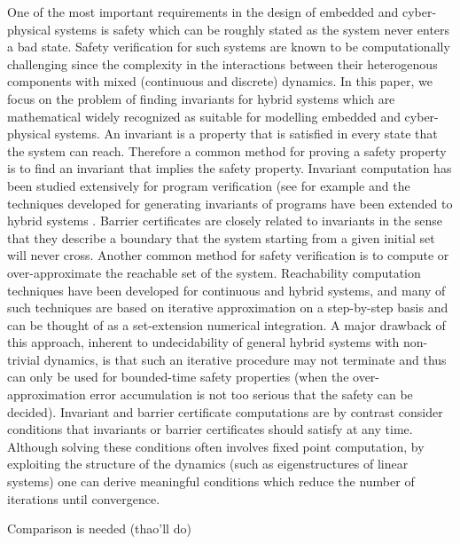 One of the most important requirements in the design of embedded and cyber-physical systems is safety which can be roughly stated as the system never enters a bad state. Safety verification for such systems are known to be computationally challenging since the complexity in the interactions between their heterogenous components with mixed (continuous and discrete) dynamics. In this paper, we focus on the problem of finding invariants for hybrid systems which are mathematical widely recognized as suitable for modelling embedded and cyber-physical systems. An invariant is a property that is satisfied in every state that the system can reach. 
Therefore a common method for proving a safety property is to find an invariant that implies the safety property. Invariant computation has been studied extensively for program verification (see for example \cite{CousotHalbwachs1978,Bensalem2000,Tiwari2001,SriramSipma2004,colonSriramSipma2003,Fluctuat} and the techniques developed for generating invariants of programs have been extended to hybrid systems \cite{Sriram,Jeannet,tiwariRodriguezCarbonellPolynomialInvariants,Goubault,HybridFluctuat,differentialInvariantPlatzer,Gawlitza}. Barrier certificates \cite{prajna2004safety} are closely related to invariants in the sense that they describe a boundary that the system starting from a given initial set will never cross. Another common method for safety verification is to compute or over-approximate the reachable set of the system. Reachability computation techniques have been developed for continuous and hybrid systems, and many of such techniques are based on iterative approximation on a step-by-step basis and can be thought of as a set-extension numerical integration. A major drawback of this approach, inherent to undecidability of general hybrid systems with non-trivial dynamics, is that such an iterative procedure may not terminate and thus can only be used for bounded-time safety properties (when the over-approximation error accumulation is not too serious that the safety can be decided). Invariant and barrier certificate computations are by contrast consider conditions that invariants or barrier certificates should satisfy at any time. Although solving these conditions often involves fixed point computation, by exploiting the structure of the dynamics (such as eigenstructures of linear systems) one can derive meaningful conditions which reduce the number of iterations until convergence.

Comparison is needed (thao'll do)


